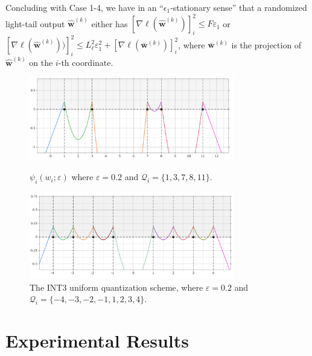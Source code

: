 \documentclass[10pt,a4paper]{article}
\begin{document}
Concluding with Case 1-4, we have in an ``$\epsilon_1$-stationary sense'' that a randomized light-tail output $\hat{\mathbf{w}}^{(k)}$ either has $[\nabla\ell(\hat{\mathbf{w}}^{(k)})]_i^2\leq F\varepsilon_1$ or $[\nabla\ell(\hat{\mathbf{w}}^{(k)}))]_i^2\leq L_\ell^2\varepsilon_1^2+[\nabla\ell(\bar{\mathbf{w}}^{(k)})]_i^2$, where $\bar{\mathbf{w}}^{(k)}$ is the projection of $\hat{\mathbf{w}}^{(k)}$ on the $i$-th coordinate.

\begin{figure}[H]
  \centering
  \includegraphics[width=0.8\textwidth]{psi.png}
  \caption{$\psi_i(w_i;\varepsilon)$ where $\varepsilon=0.2$ and $\mathcal{Q}_i=\{1,3,7,8,11\}$.}
  \includegraphics[width=0.8\textwidth]{psi2.png}
  \caption{The INT3 uniform quantization scheme, where $\varepsilon=0.2$ and $\mathcal{Q}_i=\{-4,-3,-2,-1,1,2,3,4\}$.}

\end{figure}

\newpage
\section{Experimental Results}
\end{document}
